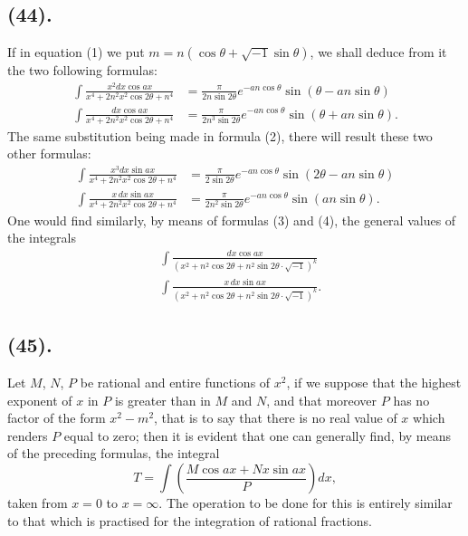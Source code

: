 \documentclass{article}
\begin{document}
\subsection*{(44).}

If in equation (1) we put $m=n(\cos\theta+\sqrt{-1}\sin\theta)$, we shall deduce from it the two following formulas:
\[ \begin{aligned} \int\frac{x^{2}dx\cos ax}{x^{4}+2n^{2}x^{2}\cos2\theta+n^{4}}&=\frac{\pi}{2n\sin2\theta}e^{-an\cos\theta}\sin(\theta-an\sin\theta)\\ \int\frac{dx\cos ax}{x^{4}+2n^{2}x^{2}\cos2\theta+n^{4}}&=\frac{\pi}{2n^{3}\sin2\theta}e^{-an\cos\theta}\sin(\theta+an\sin\theta). \end{aligned} \tag{5} \]
The same substitution being made in formula (2), there will result these two other formulas:
\[ \begin{aligned} \int\frac{x^{3}dx\sin ax}{x^{4}+2n^{2}x^{2}\cos2\theta+n^{4}}&=\frac{\pi}{2\sin2\theta}e^{-an\cos\theta}\sin(2\theta-an\sin\theta)\\ \int\frac{x\,dx\sin ax}{x^{4}+2n^{2}x^{2}\cos2\theta+n^{4}}&=\frac{\pi}{2n^{2}\sin2\theta}e^{-an\cos\theta}\sin(an\sin\theta). \end{aligned} \tag{6} \]
One would find similarly, by means of formulas (3) and (4), the general values of the integrals
\[ \begin{aligned} &\int\frac{dx\cos ax}{(x^{2}+n^{2}\cos2\theta+n^{2}\sin2\theta\cdot\sqrt{-1})^{k}}\\ &\int\frac{x\,dx\sin ax}{(x^{2}+n^{2}\cos2\theta+n^{2}\sin2\theta\cdot\sqrt{-1})^{k}}. \end{aligned} \tag{7} \]


\subsection*{(45).}

Let $M$, $N$, $P$ be rational and entire functions of $x^{2}$, if we suppose that the highest exponent of $x$ in $P$ is greater than in $M$ and $N$, and that moreover $P$ has no factor of the form $x^{2}-m^{2}$, that is to say that there is no real value of $x$ which renders $P$ equal to zero; then it is evident that one can generally find, by means of the preceding formulas, the integral
\[ T=\int\left(\frac{M\cos ax+Nx\sin ax}{P}\right)dx, \tag{8} \]
taken from $x=0$ to $x=\infty$. The operation to be done for this is entirely similar to that which is practised for the integration of rational fractions.
\end{document}
